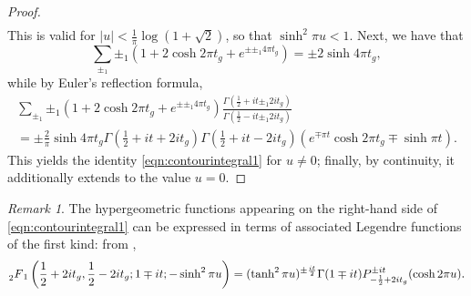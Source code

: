 \documentclass[11pt,a4paper]{amsart}
\numberwithin{equation}{section}
\theoremstyle{remark}
\newtheorem{remark}[equation]{Remark}
\theoremstyle{definition}
\begin{document}
\begin{proof}
\begin{multline*}
\end{multline*}
This is valid for $|u| < \frac{1}{\pi} \log(1 + \sqrt{2})$, so that $\sinh^2 \pi u < 1$. Next, we have that
\[\sum_{\pm_1} \pm_1 (1 + 2 \cosh 2\pi t_g + e^{\pm \pm_1 4\pi t_g}) = \pm 2 \sinh 4\pi t_g,\]
while by Euler's reflection formula,
\begin{multline*}
\sum_{\pm_1} \pm_1 (1 + 2 \cosh 2\pi t_g + e^{\pm \pm_1 4\pi t_g}) \frac{\Gamma\left(\frac{1}{2} + it \pm_1 2it_g\right)}{\Gamma\left(\frac{1}{2} - it \pm_1 2it_g\right)}	\\
= \pm \frac{2}{\pi} \sinh 4\pi t_g \Gamma\left(\frac{1}{2} + it + 2it_g\right) \Gamma\left(\frac{1}{2} + it - 2it_g\right) (e^{\mp \pi t} \cosh 2\pi t_g \mp \sinh \pi t).
\end{multline*}
This yields the identity \eqref{eqn:contourintegral1} for $u \neq 0$; finally, by continuity, it additionally extends to the value $u = 0$.
\end{proof}

\begin{remark}
The hypergeometric functions appearing on the right-hand side of \eqref{eqn:contourintegral1} can be expressed in terms of associated Legendre functions of the first kind: from \cite[8.702]{GR15},
\[\prescript{}{2}{F}_1\left(\frac{1}{2} + 2it_g,\frac{1}{2} - 2it_g;1 \mp it; -\sinh^2 \pi u\right) = (\tanh^2\pi u)^{\pm \frac{it}{2}} \Gamma(1 \mp it) P_{-\frac{1}{2} + 2it_g}^{\pm it}(\cosh 2\pi u).\]
\end{remark}
\end{document}
